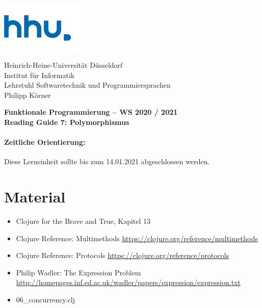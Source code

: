 \documentclass[11pt,a4paper]{article}
\theoremstyle{break}
\begin{document}
\begin{minipage}[b]{\textwidth}
\parbox[t]{5cm}{%
\includegraphics[width=4cm]{unilogo}
\hfill
}
\parbox[b]{11cm}{%
Heinrich-Heine-Universit\"at D\"usseldorf\\
Institut f\"ur Informatik\\
Lehrstuhl Softwaretechnik und Programmiersprachen\\
Philipp K\"orner
}

\end{minipage}
\begin{center}
\bf
Funktionale Programmierung -- WS 2020 / 2021\\
Reading Guide 7: Polymorphismus
\end{center}

\pagestyle{empty}

\paragraph{Zeitliche Orientierung:} Diese Lerneinheit sollte bis zum 14.01.2021 abgeschlossen werden.

\section{Material} 

\begin{itemize}
\item Clojure for the Brave and True, Kapitel 13
\item Clojure Reference: Multimethods \url{https://clojure.org/reference/multimethods}
\item Clojure Reference: Protocols \url{https://clojure.org/reference/protocols}
\item Philip Wadler: The Expression Problem \url{http://homepages.inf.ed.ac.uk/wadler/papers/expression/expression.txt}
\item 06\_concurrency.clj
\end{itemize}
\end{document}
